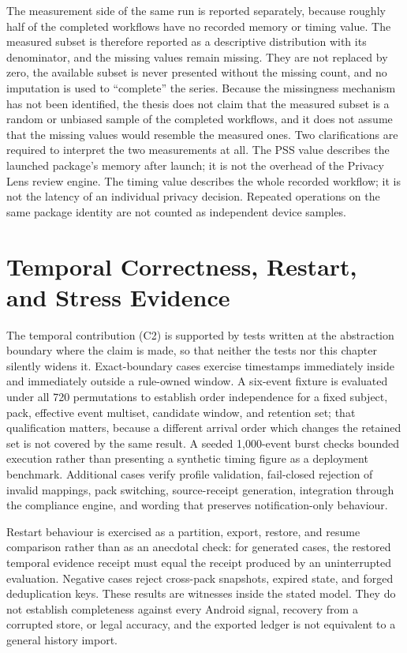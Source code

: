 The measurement side of the same run is reported separately, because roughly half of the completed workflows have no recorded memory or timing value. The measured subset is therefore reported as a descriptive distribution with its denominator, and the missing values remain missing. They are not replaced by zero, the available subset is never presented without the missing count, and no imputation is used to ``complete'' the series. Because the missingness mechanism has not been identified, the thesis does not claim that the measured subset is a random or unbiased sample of the completed workflows, and it does not assume that the missing values would resemble the measured ones. Two clarifications are required to interpret the two measurements at all. The PSS value describes the launched package's memory after launch; it is not the overhead of the Privacy Lens review engine. The timing value describes the whole recorded workflow; it is not the latency of an individual privacy decision. Repeated operations on the same package identity are not counted as independent device samples.

\section{Temporal Correctness, Restart, and Stress Evidence}

The temporal contribution (C2) is supported by tests written at the abstraction boundary where the claim is made, so that neither the tests nor this chapter silently widens it. Exact-boundary cases exercise timestamps immediately inside and immediately outside a rule-owned window. A six-event fixture is evaluated under all 720 permutations to establish order independence for a fixed subject, pack, effective event multiset, candidate window, and retention set; that qualification matters, because a different arrival order which changes the retained set is not covered by the same result. A seeded 1,000-event burst checks bounded execution rather than presenting a synthetic timing figure as a deployment benchmark. Additional cases verify profile validation, fail-closed rejection of invalid mappings, pack switching, source-receipt generation, integration through the compliance engine, and wording that preserves notification-only behaviour.

Restart behaviour is exercised as a partition, export, restore, and resume comparison rather than as an anecdotal check: for \StressRestartN{} generated cases, the restored temporal evidence receipt must equal the receipt produced by an uninterrupted evaluation. Negative cases reject cross-pack snapshots, expired state, and forged deduplication keys. These results are witnesses inside the stated model. They do not establish completeness against every Android signal, recovery from a corrupted store, or legal accuracy, and the exported ledger is not equivalent to a general history import.

